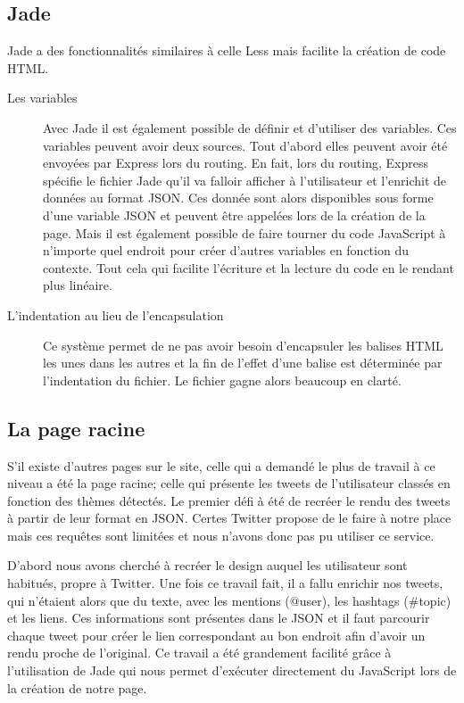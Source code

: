\documentclass[a4paper]{article}
\begin{document}
\subsection{Jade}
Jade a des fonctionnalités similaires à celle Less mais facilite la création de code HTML. 
\begin{description}
 	\item[Les variables] Avec Jade il est également possible de définir et d'utiliser des variables. Ces variables peuvent avoir deux sources. Tout d'abord elles peuvent avoir été envoyées par Express lors du routing. En fait, lors du routing, Express spécifie le fichier Jade qu'il va falloir afficher à l'utilisateur et l'enrichit de données au format JSON. Ces donnée sont alors disponibles sous forme d'une variable JSON et peuvent être appelées lors de la création de la page.	Mais il est également possible de faire tourner du code JavaScript à n'importe quel endroit pour créer d'autres variables en fonction du contexte. Tout cela qui facilite l'écriture et la lecture du code en le rendant plus linéaire.
 	\item[L'indentation au lieu de l'encapsulation] Ce système permet de ne pas avoir besoin d'encapsuler les balises HTML les unes dans les autres et la fin de l'effet d'une balise est déterminée par l'indentation du fichier. Le fichier gagne alors beaucoup en clarté.
 \end{description}

\subsection{La page racine}
S'il existe d'autres pages sur le site, celle qui a demandé le plus de travail à ce niveau a été la page racine; celle qui présente les tweets de l'utilisateur classés en fonction des thèmes détectés. Le premier défi à été de recréer le rendu des tweets à partir de leur format en JSON. Certes Twitter propose de le faire à notre place mais ces requêtes sont limitées et nous n'avons donc pas pu utiliser ce service. 

D'abord nous avons cherché à recréer le design auquel les utilisateur sont habitués, propre à Twitter. Une fois ce travail fait, il a fallu enrichir nos tweets, qui n'étaient alors que du texte, avec les mentions (@user), les hashtags (\#topic) et les liens. Ces informations sont présentes dans le JSON et il faut parcourir chaque tweet pour créer le lien correspondant au bon endroit afin d'avoir un rendu proche de l'original. Ce travail a été grandement facilité grâce à l'utilisation de Jade qui nous permet d'exécuter directement du JavaScript lors de la création de notre page. 
\end{document}
